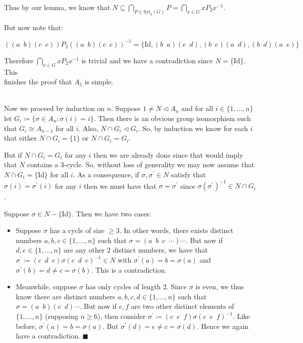 \documentclass{book}
\newenvironment{myIndent}{%
   \begin{adjustwidth}{2.5em}{0em}%
}{%
   \end{adjustwidth}%
}
\newcommand{\gap}{\phantom{2}}
\newcommand{\myId}{\mathrm{Id}}
\newcommand{\Syl}{\mathrm{Syl}}
\newcommand{\mySepThree}[1][.]{%
   {\noindent\color{#1}{\rule{6in}{0.25mm}}}\\%
}
\newcommand{\retTwo}{\hfill\bigbreak}
\begin{document}
\begin{myIndent}
	Thus by our lemma, we know that $N \subseteq \bigcap_{P \in \Syl_2(G)} P = \bigcap_{x \in G} xP_2x^{-1}$.\retTwo

	But now note that:
	
	{\centering$((a\gap b)(c \gap e)) P_2 ((a\gap b)(c \gap e))^{-1} = \{\myId, (b \gap a)(e \gap d), (b \gap e)(a\gap d), (b \gap d)(a \gap e)\}$\retTwo\par}

	Therefore $\bigcap_{x \in G} xP_2x^{-1}$ is trivial and we have a contradiction since $N = \{\myId\}$. This\\ finishes the proof that $A_5$ is simple. 

	\mySepThree 

	Now we proceed by induction on $n$. Suppose $1 \neq N \lhd A_n$ and for all $i \in \{1, \ldots, n\}$ let $G_i \coloneqq \{\sigma \in A_n : \sigma(i) = i\}$. Then there is an obvious group isomorphism such that $G_i \cong A_{n-1}$ for all $i$. Also, $N \cap G_i \lhd G_i$. So, by induction we know for each $i$ that either $N \cap G_i = \{1\}$ or $N \cap G_i = G_i$.\newpage

	But if $N \cap G_i = G_i$ for any $i$ then we are already done since that would imply that $N$ contains a $3$-cycle. So, without loss of generality we may now assume that $N \cap G_i = \{\myId\}$ for all $i$. As a consequence, if $\sigma, \sigma^\prime \in N$ satisfy that $\sigma(i) = \sigma^\prime(i)$ for any $i$ then we must have that $\sigma = \sigma^\prime$ since $\sigma (\sigma^\prime)^{-1} \in N \cap G_i$.\retTwo

	Suppose $\sigma \in N - \{\myId\}$. Then we have two cases:
	\begin{itemize}
		\item Suppose $\sigma$ has a cycle of size $\geq 3$. In other words, there exists distinct numbers $a, b, c \in \{1, \ldots, n\}$ such that $\sigma = (a \gap b \gap c \gap \cdots)\cdots$. But now if $d, e \in \{1, \ldots, n\}$ are any other $2$ distinct numbers, we have that $\sigma^\prime \coloneqq (c \gap d \gap e)\sigma (c \gap d \gap e)^{-1} \in N$ with $\sigma^\prime(a) = b = \sigma(a)$ and $\sigma^\prime(b) = d \neq c = \sigma(b)$. This is a contradiction.
		
		\item Meanwhile, suppose $\sigma$ has only cycles of length $2$. Since $\sigma$ is even, we thus know there are distinct numbers $a, b, c, d \in \{1, \ldots, n\}$ such that $\sigma = (a\gap b)(c \gap d)\cdots$. But now if $e, f$ are two other distinct elements of $\{1, \ldots, n\}$ (supposing $n \geq 6$), then consider $\sigma^\prime \coloneqq (c \gap e \gap f)\sigma (c \gap e \gap f)^{-1}$. Like before, $\sigma^\prime(a) = b = \sigma(a)$. But $\sigma^\prime(d) = e \neq c = \sigma(d)$. Hence we again have a contradiction. $\blacksquare$\retTwo
	\end{itemize}
\end{myIndent}
\end{document}
